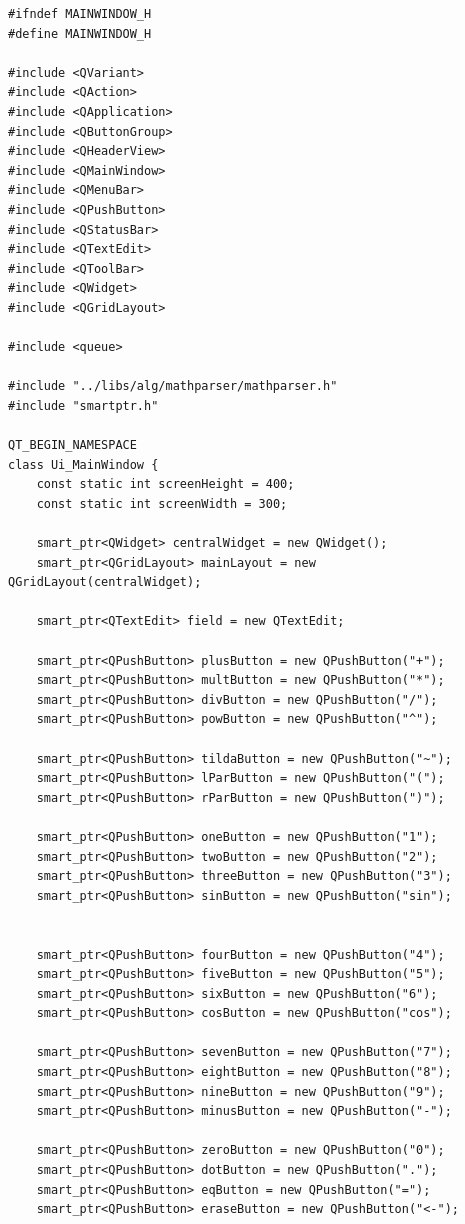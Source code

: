 \documentclass[a4paper,14pt]{extarticle}
\begin{document}
\begin{verbatim}
#ifndef MAINWINDOW_H
#define MAINWINDOW_H

#include <QVariant>
#include <QAction>
#include <QApplication>
#include <QButtonGroup>
#include <QHeaderView>
#include <QMainWindow>
#include <QMenuBar>
#include <QPushButton>
#include <QStatusBar>
#include <QTextEdit>
#include <QToolBar>
#include <QWidget>
#include <QGridLayout>

#include <queue>

#include "../libs/alg/mathparser/mathparser.h"
#include "smartptr.h"

QT_BEGIN_NAMESPACE
class Ui_MainWindow {
    const static int screenHeight = 400;
    const static int screenWidth = 300;

    smart_ptr<QWidget> centralWidget = new QWidget();
    smart_ptr<QGridLayout> mainLayout = new QGridLayout(centralWidget);

    smart_ptr<QTextEdit> field = new QTextEdit;

    smart_ptr<QPushButton> plusButton = new QPushButton("+");
    smart_ptr<QPushButton> multButton = new QPushButton("*");
    smart_ptr<QPushButton> divButton = new QPushButton("/");
    smart_ptr<QPushButton> powButton = new QPushButton("^");

    smart_ptr<QPushButton> tildaButton = new QPushButton("~");
    smart_ptr<QPushButton> lParButton = new QPushButton("(");
    smart_ptr<QPushButton> rParButton = new QPushButton(")");

    smart_ptr<QPushButton> oneButton = new QPushButton("1");
    smart_ptr<QPushButton> twoButton = new QPushButton("2");
    smart_ptr<QPushButton> threeButton = new QPushButton("3");
    smart_ptr<QPushButton> sinButton = new QPushButton("sin");


    smart_ptr<QPushButton> fourButton = new QPushButton("4");
    smart_ptr<QPushButton> fiveButton = new QPushButton("5");
    smart_ptr<QPushButton> sixButton = new QPushButton("6");
    smart_ptr<QPushButton> cosButton = new QPushButton("cos");

    smart_ptr<QPushButton> sevenButton = new QPushButton("7");
    smart_ptr<QPushButton> eightButton = new QPushButton("8");
    smart_ptr<QPushButton> nineButton = new QPushButton("9");
    smart_ptr<QPushButton> minusButton = new QPushButton("-");

    smart_ptr<QPushButton> zeroButton = new QPushButton("0");
    smart_ptr<QPushButton> dotButton = new QPushButton(".");
    smart_ptr<QPushButton> eqButton = new QPushButton("=");
    smart_ptr<QPushButton> eraseButton = new QPushButton("<-");


\end{verbatim}
\end{document}

